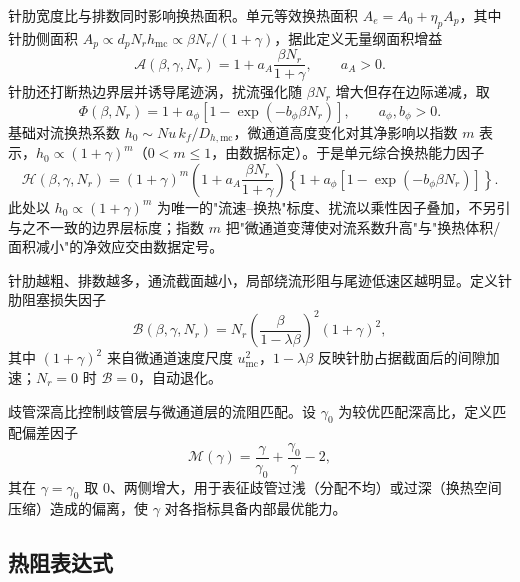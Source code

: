 \documentclass[12pt,a4paper]{ctexart}
\begin{document}
针肋宽度比与排数同时影响换热面积。单元等效换热面积 $A_e=A_0+\eta_pA_p$，其中针肋侧面积 $A_p\propto d_pN_rh_{\mathrm{mc}}\propto \beta N_r/(1+\gamma)$，据此定义无量纲面积增益
\begin{equation}
    \mathcal{A}(\beta,\gamma,N_r)=1+a_A\frac{\beta N_r}{1+\gamma},\qquad a_A>0.
\end{equation}
针肋还打断热边界层并诱导尾迹涡，扰流强化随 $\beta N_r$ 增大但存在边际递减，取
\begin{equation}
    \Phi(\beta,N_r)=1+a_\phi\left[1-\exp(-b_\phi\beta N_r)\right],\qquad a_\phi,b_\phi>0.
\end{equation}
基础对流换热系数 $h_0\sim Nu\,k_f/D_{h,\mathrm{mc}}$，微通道高度变化对其净影响以指数 $m$ 表示，$h_0\propto(1+\gamma)^m$（$0<m\le1$，由数据标定）。于是单元综合换热能力因子
\begin{equation}
    \mathcal{H}(\beta,\gamma,N_r)
    =(1+\gamma)^m
    \left(1+a_A\frac{\beta N_r}{1+\gamma}\right)
    \left\{1+a_\phi\left[1-\exp(-b_\phi\beta N_r)\right]\right\}.
\end{equation}
此处以 $h_0\propto(1+\gamma)^m$ 为唯一的"流速--换热"标度、扰流以乘性因子叠加，不另引与之不一致的边界层标度；指数 $m$ 把"微通道变薄使对流系数升高"与"换热体积/面积减小"的净效应交由数据定号。

针肋越粗、排数越多，通流截面越小，局部绕流形阻与尾迹低速区越明显。定义针肋阻塞损失因子
\begin{equation}
    \mathcal{B}(\beta,\gamma,N_r)=N_r\left(\frac{\beta}{1-\lambda\beta}\right)^2(1+\gamma)^2,
\end{equation}
其中 $(1+\gamma)^2$ 来自微通道速度尺度 $u_{\mathrm{mc}}^2$，$1-\lambda\beta$ 反映针肋占据截面后的间隙加速；$N_r=0$ 时 $\mathcal B=0$，自动退化。

歧管深高比控制歧管层与微通道层的流阻匹配。设 $\gamma_0$ 为较优匹配深高比，定义匹配偏差因子
\begin{equation}
    \mathcal{M}(\gamma)=\frac{\gamma}{\gamma_0}+\frac{\gamma_0}{\gamma}-2 ,
\end{equation}
其在 $\gamma=\gamma_0$ 取 $0$、两侧增大，用于表征歧管过浅（分配不均）或过深（换热空间压缩）造成的偏离，使 $\gamma$ 对各指标具备内部最优能力。

\subsection{热阻表达式}
\end{document}
